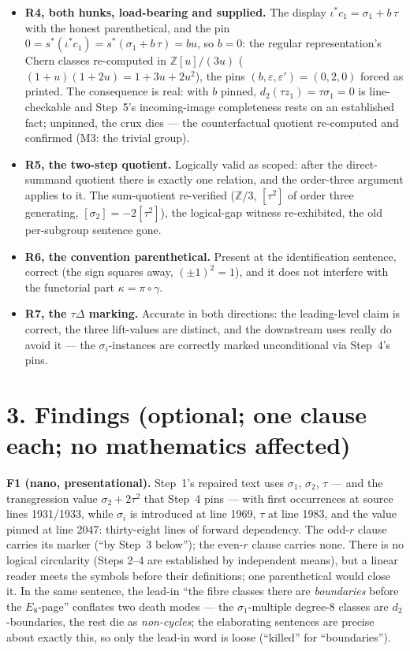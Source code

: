 \documentclass[11pt,a4paper]{article}
\newcommand{\Z}{\mathbb{Z}}
\begin{document}
\begin{itemize}[leftmargin=1.4em,itemsep=3pt]
\item \textbf{R4, both hunks, load-bearing and supplied.} The display
$\iota^*c_1=\sigma_1+b\,\tau$ with the honest parenthetical, and the pin
$0=s^*(\iota^*c_1)=s^*(\sigma_1+b\,\tau)=bu$, so $b=0$: the regular
representation's Chern classes re-computed in $\Z[u]/(3u)$
($(1+u)(1+2u)=1+3u+2u^2$), the pins $(b,\varepsilon,\varepsilon')
=(0,2,0)$ forced as printed. The consequence is real: with $b$ pinned,
$d_2(\tau z_1)=\tau\sigma_1=0$ is line-checkable and Step~5's
incoming-image completeness rests on an established fact; unpinned, the
crux dies --- the counterfactual quotient re-computed and confirmed (M3:
the trivial group).

\item \textbf{R5, the two-step quotient.} Logically valid as scoped: after
the direct-summand quotient there is exactly one relation, and the
order-three argument applies to it. The sum-quotient re-verified
($\Z/3$, $[\tau^2]$ of order three generating, $[\sigma_2]=-2[\tau^2]$),
the logical-gap witness re-exhibited, the old per-subgroup sentence gone.

\item \textbf{R6, the convention parenthetical.} Present at the
identification sentence, correct (the sign squares away, $(\pm 1)^2=1$),
and it does not interfere with the functorial part $\kappa=\pi\circ\gamma$.

\item \textbf{R7, the $\tau\Delta$ marking.} Accurate in both directions:
the leading-level claim is correct, the three lift-values are distinct,
and the downstream uses really do avoid it --- the $\sigma_i$-instances are
correctly marked unconditional via Step~4's pins.

\end{itemize}

\section*{3. Findings (optional; one clause each; no mathematics affected)}

\textbf{F1 (nano, presentational).} Step~1's repaired text uses
$\sigma_1$, $\sigma_2$, $\tau$ --- and the transgression value
$\sigma_2+2\tau^2$ that Step~4 pins --- with first occurrences at source
lines 1931/1933, while $\sigma_i$ is introduced at line 1969, $\tau$ at
line 1983, and the value pinned at line 2047: thirty-eight lines of forward
dependency. The odd-$r$ clause carries its marker (``by Step~3 below'');
the even-$r$ clause carries none. There is no logical circularity (Steps
2--4 are established by independent means), but a linear reader meets the
symbols before their definitions; one parenthetical would close it. In the
same sentence, the lead-in ``the fibre classes there are \emph{boundaries}
before the $E_8$-page'' conflates two death modes --- the
$\sigma_1$-multiple degree-8 classes are $d_2$-boundaries, the rest die as
\emph{non-cycles}; the elaborating sentences are precise about exactly
this, so only the lead-in word is loose (``killed'' for ``boundaries'').
\end{document}
